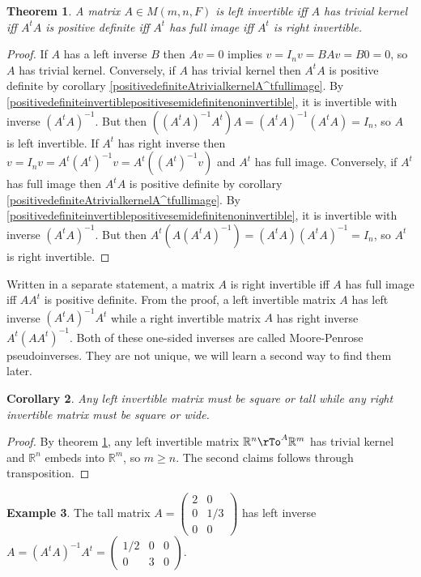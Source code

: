 \documentclass[12pt]{amsart}
\newtheorem{theorem}{Theorem}[section]
\newtheorem{corollary}[theorem]{Corollary}
\theoremstyle{definition}
\newtheorem{example}[theorem]{Example}
\begin{document}
\begin{theorem}\label{onesidedinvertibility} A matrix $A \in M(m, n, F)$ is left invertible iff $A$ has trivial kernel iff $A^tA$ is positive definite iff $A^t$ has full image iff $A^t$ is right invertible.
\end{theorem}
\begin{proof} If $A$ has a left inverse $B$ then $Av = 0$ implies $v = I_n v = BAv = B0 = 0$, so $A$ has trivial kernel. Conversely, if $A$ has trivial kernel then $A^tA$ is positive definite by corollary \ref{positivedefiniteAtrivialkernelA^tfullimage}. By \ref{positivedefiniteinvertiblepositivesemidefinitenoninvertible}, it is invertible with inverse $(A^tA)^{-1}$. But then $((A^tA)^{-1}A^t)A = (A^tA)^{-1}(A^tA) = I_n$, so $A$ is left invertible. If $A^t$ has right inverse then $v = I_n v = A^t(A^t)^{-1}v = A^t((A^t)^{-1}v)$ and $A^t$ has full image. Conversely, if $A^t$ has full image then $A^tA$ is positive definite by corollary \ref{positivedefiniteAtrivialkernelA^tfullimage}. By \ref{positivedefiniteinvertiblepositivesemidefinitenoninvertible}, it is invertible with inverse $(A^tA)^{-1}$. But then $A^t(A(A^tA)^{-1}) = (A^tA)(A^tA)^{-1} = I_n$, so $A^t$ is right invertible.
\end{proof}

Written in a separate statement, a matrix $A$ is right invertible iff $A$ has full image iff $AA^t$ is positive definite. From the proof, a left invertible matrix $A$ has left inverse $(A^tA)^{-1}A^t$ while a right invertible matrix $A$ has right inverse $A^t(AA^t)^{-1}$. Both of these one-sided inverses are called Moore-Penrose pseudoinverses. They are not unique, we will learn a second way to find them later.

\begin{corollary}\label{leftinvertiblesquareortallrightinvertiblesquareorwide} Any left invertible matrix must be square or tall while any right invertible matrix must be square or wide.
\end{corollary}
\begin{proof} By theorem \ref{onesidedinvertibility}, any left invertible matrix $\mathbb{R}^n \rTo^A \mathbb{R}^m$ has trivial kernel and $\mathbb{R}^n$ embeds into $\mathbb{R}^m$, so $m \geq n$. The second claims follows through transposition.
\end{proof}

\begin{example} The tall matrix $A = \left(\begin{array}{cc} 2 & 0 \\ 0 & 1/3 \\ 0 & 0 \end{array}\right)$ has left inverse $A = (A^tA)^{-1}A^t = \left(\begin{array}{ccc} 1/2 & 0 & 0 \\ 0 & 3 & 0 \end{array}\right)$.
\end{example}
\end{document}
